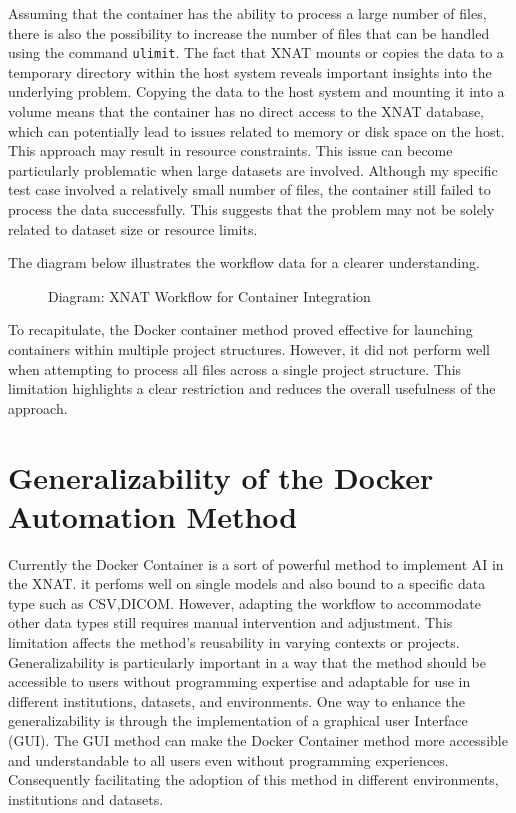 Assuming that the container has the ability to process a large number of files, there is also the possibility to increase the number of files that can be handled using the command \texttt{ulimit}.  
The fact that XNAT mounts or copies the data to a temporary directory within the host system reveals important insights into the underlying problem. Copying the data to the host system and mounting it into a volume means that the container has no direct access to the XNAT database, which can potentially lead to issues related to memory or disk space on the host. This approach may result in resource constraints.  
This issue can become particularly problematic when large datasets are involved. Although my specific test case involved a relatively small number of files, the container still failed to process the data successfully. This suggests that the problem may not be solely related to dataset size or resource limits.

The diagram below illustrates the workflow data for a clearer understanding.  

\begin{figure}[ht]
    \centering
    \def\svgwidth{\linewidth} 
    
    \caption{Diagram: XNAT Workflow for Container Integration}
    \label{fig:workflowxnat}
\end{figure}


To recapitulate, the Docker container method proved effective for launching containers within multiple project structures. However, it did not perform well when attempting to process all files across a single project structure. This limitation highlights a clear restriction and reduces the overall usefulness of the approach.

\section{Generalizability of the Docker Automation Method}

Currently the Docker Container is a sort of powerful method to implement AI in the XNAT. it perfoms well on single models and also bound to a specific data type such as CSV,DICOM. However, adapting the workflow to accommodate other data types still requires manual intervention and adjustment. This limitation affects the method’s reusability in varying contexts or projects.
Generalizability is particularly important in a way that the method should be accessible to users without programming expertise and adaptable for use in different institutions, datasets, and environments.
One way to enhance the generalizability is through the implementation of a graphical user Interface (GUI). The GUI method can make the Docker Container method more accessible and understandable to all users even without programming experiences. Consequently facilitating
the adoption of this method in different environments, institutions and datasets.  
